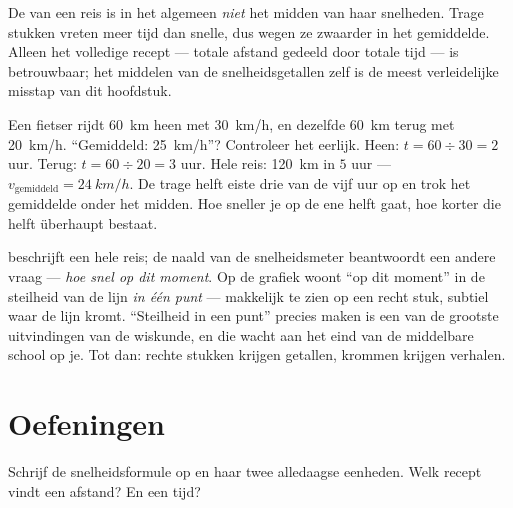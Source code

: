 \begin{proposition}[De val]\label{prop:g7:motion-average-speed:trap}
De  van een reis is in het algemeen
\emph{niet} het midden van haar snelheden. Trage stukken vreten
meer tijd dan snelle, dus wegen ze zwaarder in het gemiddelde. Alleen
het volledige recept --- totale afstand gedeeld door totale tijd --- is
betrouwbaar; het middelen van de snelheidsgetallen zelf is de meest
verleidelijke misstap van dit hoofdstuk.
\end{proposition}

\begin{example}\label{ex:g7:motion-average-speed:sprung}
Een fietser rijdt \qty{60}{km} heen met \qty{30}{km/h}, en dezelfde
\qty{60}{km} terug met \qty{20}{km/h}. ``Gemiddeld: \qty{25}{km/h}''?
Controleer het eerlijk. Heen: $t = 60 \div 30 = 2$ uur. Terug: $t =
60 \div 20 = 3$ uur. Hele reis: \qty{120}{km} in $5$
uur --- $v_{\text{gemiddeld}} = \qty{24}{km/h}$. De trage helft
eiste drie van de vijf uur op en trok het gemiddelde onder het
midden. Hoe sneller je op de ene helft gaat, hoe korter die helft
überhaupt bestaat.
\end{example}

\begin{remark}\label{rem:g7:motion-average-speed:speedometer}
 beschrijft een hele reis; de naald van de
snelheidsmeter beantwoordt een andere vraag --- \emph{hoe snel op dit
moment}. Op de grafiek woont ``op dit moment'' in de steilheid van de
lijn \emph{in één punt} --- makkelijk te zien op een recht stuk,
subtiel waar de lijn kromt. ``Steilheid in een punt'' precies maken is
een van de grootste uitvindingen van de wiskunde, en die wacht aan het
eind van de middelbare school op je. Tot dan: rechte stukken krijgen
getallen, krommen krijgen verhalen.
\end{remark}

\section{Oefeningen}

\begin{exercise}[$\star$]\label{exo:g7:motion-average-speed:1}
Schrijf de snelheidsformule op en haar twee alledaagse
eenheden. Welk recept vindt een afstand? En een tijd?
\end{exercise}

